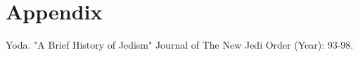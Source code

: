 \documentclass[11pt, spanish]{report}
\begin{document}

\tableofcontents
 
\newpage

\listoffigures
{} 


\listoftables 
{} 
\newpage



\newpage

\clearpage








\clearpage
\section*{Appendix}


\begin{thebibliography}{}
 Yoda. "A Brief History of Jedism" Journal of The New Jedi Order (Year): 93-98.
 \end{thebibliography} 
 
\end{document}
